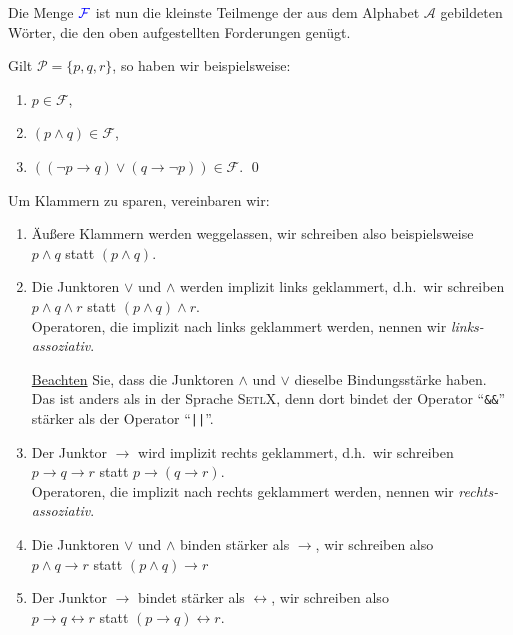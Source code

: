 Die Menge ${\color{blue}\mathcal{F}}$ ist nun die kleinste Teilmenge der aus dem Alphabet $\mathcal{A}$
gebildeten W\"{o}rter, die den oben aufgestellten Forderungen gen\"{u}gt.

\example 
Gilt $\mathcal{P} = \{ p, q, r \}$, so haben wir beispielsweise:
\begin{enumerate}
\item $p \in \mathcal{F}$,
\item $(p \wedge q) \in \mathcal{F}$,
\item $((\neg p \rightarrow q) \vee (q \rightarrow \neg p)) \in \mathcal{F}$.  \qed
\end{enumerate}

\noindent
Um Klammern zu sparen, vereinbaren wir:
\begin{enumerate}
\item \"{A}u\ss{}ere Klammern werden weggelassen, wir schreiben also beispielsweise \\[0.2cm]
      \hspace*{1.3cm} $p \wedge q$ \quad statt \quad $(p \wedge q)$.
\item Die Junktoren  $\vee$ und $\wedge$ werden implizit links geklammert, d.h.~wir
      schreiben 
      \\[0.2cm]
      \hspace*{1.3cm} $p \wedge q \wedge r$ \quad statt \quad $(p \wedge q) \wedge r$.
      \\[0.2cm]
      Operatoren, die implizit nach links geklammert werden, nennen wir \emph{\color{blue}links-assoziativ}.

      \underline{\color{red}Beachten} Sie, dass die Junktoren $\wedge$ und $\vee$ dieselbe Bindungsst\"arke
      haben.  Das ist anders als in der Sprache \textsc{SetlX}, denn dort bindet der Operator
      ``\texttt{\&\&}'' st\"arker als der Operator ``\texttt{||}''.
\item Der Junktor $\rightarrow$ wird implizit rechts geklammert, d.h.~wir
      schreiben \\[0.2cm]
      \hspace*{1.3cm} $p \rightarrow q \rightarrow r$ \quad statt \quad $p \rightarrow (q \rightarrow r)$.
      \\[0.2cm]
      Operatoren, die implizit nach rechts geklammert werden, nennen wir \emph{\color{blue}rechts-assoziativ}.
\item Die Junktoren $\vee$ und $\wedge$ binden st\"{a}rker als $\rightarrow$, wir schreiben
      also \\[0.2cm]
      \hspace*{1.3cm} $p \wedge q \rightarrow r$ \quad statt \quad $(p \wedge q) \rightarrow r$
\item Der Junktor $\rightarrow$ bindet st\"{a}rker als $\leftrightarrow$, wir schreiben
      also \\[0.2cm]
      \hspace*{1.3cm} $p \rightarrow q \leftrightarrow r$ \quad statt \quad $(p \rightarrow q) \leftrightarrow r$.
\end{enumerate}

